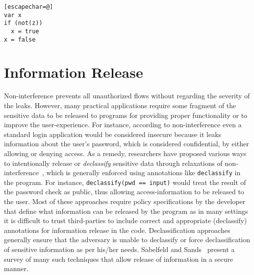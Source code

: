\begin{lstlisting}[float,caption=Permissiveness of flow-sensitive
  analysis,label=lst1.1.1][escapechar=@] 
var x
if (not(z))
  x = true
x = false
\end{lstlisting}

\section{Information Release}
Non-interference prevents all unauthorized flows without
regarding the severity of the leaks. However, many practical
applications require some fragment of the sensitive data to be
released to programs for providing proper functionality or to improve
the user-experience. For instance, according to non-interference even
a standard login application would be considered insecure because it
leaks information about the user’s password, which is considered 
confidential, by either allowing or denying access. 
As a remedy, researchers have proposed various ways to intentionally
release or \emph{declassify} sensitive data through relaxations of
non-interference~\cite{dimDecl}, which is generally enforced using
annotations like \texttt{declassify} in the program. For instance,
\texttt{declassify(pwd == input)} would treat the result 
of the password check as public, thus allowing access-information to
be released to the user. Most of these approaches require policy
specifications by the developer that define what information can be
released by the program as in many settings it is difficult to trust 
third-parties to include correct and appropriate (declassify)
annotations for information release in the code. Declassification
approaches generally ensure that the adversary is unable to declassify
or force declassification of sensitive information as per his/her
needs. Sabelfeld and Sands~\cite{dimDecl} present a survey
of many such techniques that allow release of information in a secure
manner. 

